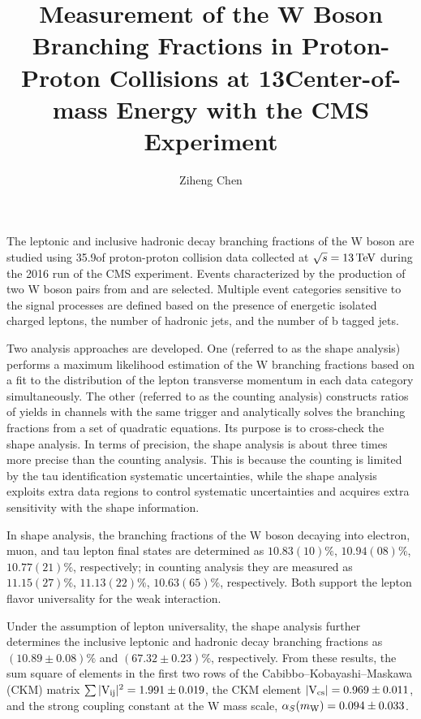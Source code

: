 \documentclass[12pt,reqno]{nuthesis}
\author{Ziheng Chen}
\title{Measurement of the W Boson Branching Fractions in Proton-Proton Collisions at 13\TeV Center-of-mass Energy with the CMS Experiment}
\begin{document}
    
    


    \frontmatter

    \maketitle

    \copyrightpage

    \abstract
    The leptonic and inclusive hadronic decay branching fractions of the W boson are studied using 35.9\fbinv of proton-proton collision data collected at $\sqrt{s}=13\,\text{Te\hspace{-.08em}V}$ during the 2016 run of the CMS experiment. Events characterized by the production of two W boson pairs from \ttbar and \tW are selected. Multiple event categories sensitive to the signal processes are defined based on the presence of energetic isolated charged leptons, the number of hadronic jets, and the number of b tagged jets.  
    
    Two analysis approaches are developed. One (referred to as the shape analysis) performs a maximum likelihood estimation of the W branching fractions based on a fit to the distribution of the lepton transverse momentum in each data category simultaneously. The other (referred to as the counting analysis) constructs ratios of yields in channels with the same trigger and analytically solves the branching fractions from a set of quadratic equations. Its purpose is to cross-check the shape analysis. In terms of precision, the shape analysis is about three times more precise than the counting analysis. This is because the counting is limited by the tau identification systematic uncertainties, while the shape analysis exploits extra data regions to control systematic uncertainties and acquires extra sensitivity with the shape information.
    
    
    
    In shape analysis, the branching fractions of the W boson decaying into electron, muon, and tau lepton final states are determined as $10.83(10)\%$, $10.94(08)\%$, $10.77(21)\%$, respectively; in counting analysis they are measured as $11.15(27)\%$, $11.13(22)\%$, $10.63(65)\%$, respectively. Both support the lepton flavor universality for the weak interaction. 
    
    Under the assumption of lepton universality, the shape analysis further determines the inclusive leptonic and hadronic decay branching fractions as $(10.89 \pm 0.08)\%$ and $(67.32 \pm 0.23)\%$, respectively. From these results, the sum square of elements in the first two rows of the Cabibbo--Kobayashi--Maskawa (CKM) matrix  $\sum{\ensuremath{\lvert \mathrm{V_{ij}} \rvert}^{2}} = 1.991 \pm 0.019$, the CKM element $\lvert \mathrm{V_{cs}} \rvert = 0.969 \pm 0.011$, and the strong coupling constant at the W mass scale, $\alpha_S(m_\mathrm{W}) = 0.094 \pm 0.033$.
\end{document}

